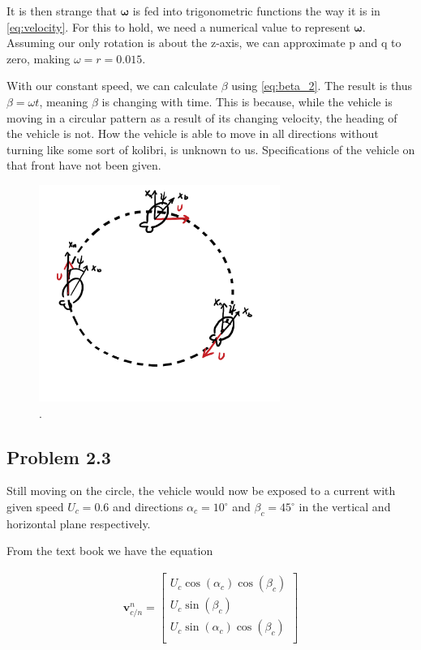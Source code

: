 It is then strange that $\boldsymbol{\omega}$ is fed into trigonometric functions the way it is in \eqref{eq:velocity}. For this to hold, we need a numerical value to represent $\boldsymbol{\omega}$. Assuming our only rotation is about the z-axis, we can approximate p and q to zero, making $\omega = r = 0.015$.

With our constant speed, we can calculate $\beta$ using \eqref{eq:beta_2}. The result is thus $\beta = \omega t$, meaning $\beta$ is changing with time. This is because, while the vehicle is moving in a circular pattern as a result of its changing velocity, the heading of the vehicle is not. How the vehicle is able to move in all directions without turning like some sort of kolibri, is unknown to us. Specifications of the vehicle on that front have not been given. 

\begin{figure}[!htb]
	\centering
	\includegraphics[width=0.70\textwidth]{figures/circleWithU.png}
	\caption{.}
\label{fig:circleWithU}
\end{figure}

\subsection*{Problem 2.3}

Still moving on the circle, the vehicle would now be exposed to a current with given speed $U_c = 0.6$ and directions $\alpha_c = 10^\circ$ and $\beta_c = 45^\circ$ in the vertical and horizontal plane respectively.

From the text book \cite{Fossen2011} we have the equation

\begin{equation}
    \begin{aligned}
    \mathbf{v}_{c/n}^n 
    =
    \begin{bmatrix}
    U_c \cos(\alpha_c) \cos(\beta_c) \\
    U_c \sin(\beta_c) \\
    U_c \sin(\alpha_c) \cos(\beta_c)\\
    \end{bmatrix}
    \label{eq:v_n_c}
    \end{aligned}
\end{equation}

